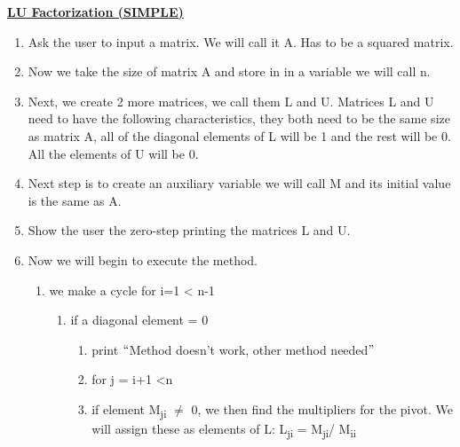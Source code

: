 \documentclass[12pt]{article}
\renewcommand{\_}{\kern-1.5pt\textunderscore\kern-1.5pt}
\begin{document}
\textbf{\uline{LU Factorization (SIMPLE)}}\par

\begin{enumerate}
	\item Ask the user to input a matrix. We will call it A. Has to be a squared matrix. \par

	\item Now we take the size of matrix A and store in in a variable we will call n. \par

	\item Next, we create 2 more matrices, we call them L and U. Matrices L and U need to have the following characteristics, they both need to be the same size as matrix A, all of the diagonal elements of L will be 1 and the rest will be 0. All the elements of U will be 0. \par

	\item Next step is to create an auxiliary variable we will call M and its initial value is the same as A.\par

	\item Show the user the zero-step printing the matrices L and U.\par

	\item Now we will begin to execute the method.\par

\begin{enumerate}
	\item we make a cycle for i=1 < n-1\par

\begin{enumerate}
	\item if a diagonal element = 0 \par

\begin{enumerate}
	\item print $``$Method doesn’t work, other method needed$"$ \par

	\item for j = i+1 <n\par

	\item if element M\textsubscript{ji }$ \neq $  0, we then find the multipliers for the pivot. We will assign these as elements of L: L\textsubscript{ji }= M\textsubscript{ji}/ M\textsubscript{ii }\par



\end{enumerate}
\end{enumerate}
\end{enumerate}
\end{enumerate}
\end{document}
